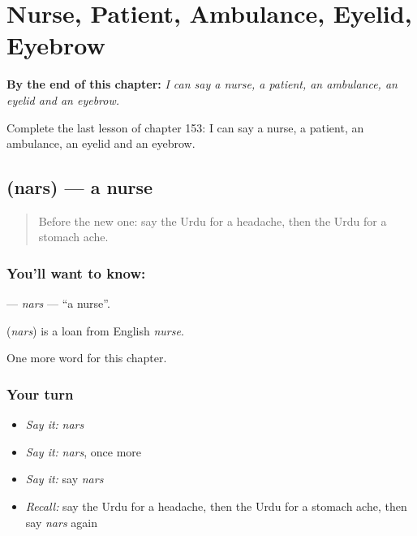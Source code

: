 
\chapter{Nurse, Patient, Ambulance, Eyelid, Eyebrow}
\label{ch:ur-nurse-patient-ambulance-eyelid-eyebrow}

\begin{chapteropening}
\textbf{By the end of this chapter:} \emph{I can say a nurse, a patient, an ambulance, an eyelid and an eyebrow.}

Complete the last lesson of chapter 153: I can say a nurse, a patient, an ambulance, an eyelid and an eyebrow.
\end{chapteropening}

\section[\texorpdfstring{\ur{نرس} (nars)}{نرس (nars)}]{ (nars) — a nurse}

\label{lesson:UR-C153-nars}



\begin{quote}
Before the new one: say the Urdu for a headache, then the Urdu for a stomach ache.
\end{quote}

\subsection*{You'll want to know: }
\textbf{} — \emph{nars} — \textquotedblleft{}a nurse\textquotedblright{}.

\begin{cousinweb}
\textbf{} (\emph{nars}) is a loan from English \emph{nurse}.
\end{cousinweb}

\begin{grammarlens}[title={What you've built}]
One more word for this chapter.
\end{grammarlens}

\subsection*{Your turn}
\begin{itemize}
\raggedright
  \item \emph{Say it:} \emph{nars}
  \item \emph{Say it:} \emph{nars}, once more
  \item \emph{Say it:} say \emph{nars}
  \item \emph{Recall:} say the Urdu for a headache, then the Urdu for a stomach ache, then say \emph{nars} again
\end{itemize}

